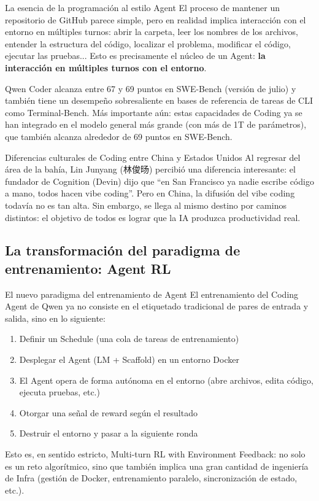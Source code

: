 \documentclass[a4paper]{article}
\begin{document}
\begin{importantbox}{La esencia de la programación al estilo Agent}
El proceso de mantener un repositorio de GitHub parece simple, pero en realidad implica interacción con el entorno en múltiples turnos: abrir la carpeta, leer los nombres de los archivos, entender la estructura del código, localizar el problema, modificar el código, ejecutar las pruebas... Esto es precisamente el núcleo de un Agent: \textbf{la interacción en múltiples turnos con el entorno}.
\end{importantbox}

Qwen Coder alcanza entre 67 y 69 puntos en SWE-Bench (versión de julio) y también tiene un desempeño sobresaliente en bases de referencia de tareas de CLI como Terminal-Bench. Más importante aún: estas capacidades de Coding ya se han integrado en el modelo general más grande (con más de 1T de parámetros), que también alcanza alrededor de 69 puntos en SWE-Bench.

\begin{knowledgebox}{Diferencias culturales de Coding entre China y Estados Unidos}
Al regresar del área de la bahía, Lin Junyang (林俊旸) percibió una diferencia interesante: el fundador de Cognition (Devin) dijo que ``en San Francisco ya nadie escribe código a mano, todos hacen vibe coding''. Pero en China, la difusión del vibe coding todavía no es tan alta. Sin embargo, se llega al mismo destino por caminos distintos: el objetivo de todos es lograr que la IA produzca productividad real.
\end{knowledgebox}

\subsection{La transformación del paradigma de entrenamiento: Agent RL}

\begin{importantbox}{El nuevo paradigma del entrenamiento de Agent}
El entrenamiento del Coding Agent de Qwen ya no consiste en el etiquetado tradicional de pares de entrada y salida, sino en lo siguiente:
\begin{enumerate}
    \item Definir un Schedule (una cola de tareas de entrenamiento)
    \item Desplegar el Agent (LM + Scaffold) en un entorno Docker
    \item El Agent opera de forma autónoma en el entorno (abre archivos, edita código, ejecuta pruebas, etc.)
    \item Otorgar una señal de reward según el resultado
    \item Destruir el entorno y pasar a la siguiente ronda
\end{enumerate}
Esto es, en sentido estricto, Multi-turn RL with Environment Feedback: no solo es un reto algorítmico, sino que también implica una gran cantidad de ingeniería de Infra (gestión de Docker, entrenamiento paralelo, sincronización de estado, etc.).
\end{importantbox}
\end{document}
